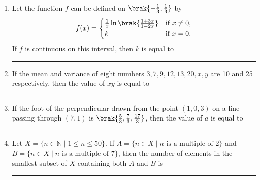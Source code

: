 \documentclass{article}
\begin{document}
\begin{enumerate}
\item Let the function $f$ can be defined on $\brak{ -\frac{1}{3}, \frac{1}{3} }$ by\[f(x) =\begin{cases}\frac{1}{x} \ln\brak {\frac{1 + 3x}{1 - 2x} }& \text{if } x \neq 0, \\k & \text{if } x = 0.\end{cases}\]If $f$ is continuous on this interval, then $k$ is equal to \rule{1cm}{0.1pt}

\item If the mean and variance of eight numbers $3, 7, 9, 12, 13, 20, x, y$ are 10 and 25 respectively, then the value of $x  y$ is equal to \rule{1cm}{0.1pt}

\item If the foot of the perpendicular drawn from the point $(1, 0, 3)$ on a line passing through $(7,1)$ is $\brak{\frac{5}{3}, \frac{7}{3}, \frac{17}{3}}$, then the value of $a$ is equal to \rule{1cm}{0.1pt}

\item Let $X = \{ n \in \mathbb{N} \mid 1 \leq n \leq 50 \}$. 
If $A = \{ n \in X \mid n \text{ is a multiple of } 2 \}$ and  $B = \{ n \in X \mid n \text{ is a multiple of } 7 \}$,  
then the number of elements in the smallest subset of $X$ containing both $A$ and $B$ is \rule{1cm}{0.1pt}

\end{enumerate}
\end{document}
